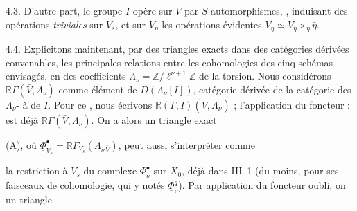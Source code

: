 \documentclass[11pt,a4paper]{article}
\begin{document}
4.3. D'autre part, le groupe $I$ opère sur $\bar V$ par $S$-automorphismes,
, 
induisant des opérations \emph{triviales} sur $V_{\bar s}$, et sur $V_{\bar\eta}$ les
 opérations évidentes 
$V_{\bar\eta} \simeq V_\eta \times_\eta \bar\eta$.

4.4. Explicitons maintenant, par des triangles exacts dans des catégories dérivées
convenables, les principales relations \struck{\ill{}} entre les cohomologies des cinq
schémas envisagés, en  des coefficients
$\Lambda_\nu = \mathbb{Z}/\ell^{\nu+1}\mathbb{Z}$  \ill{} de la torsion.
Nous considérons
$\mathbb{R}\Gamma(\bar V, \Lambda_\nu)$ comme élément de
$D(\Lambda_\nu[I])$, catégorie dérivée de la catégorie des $\Lambda_\nu$-
à   de $I$. Pour  ce ,
nous écrivons  $\mathbb{R}(\Gamma, I)(\bar V, \Lambda_\nu)$ ;
l'application du foncteur  : est déjà 
$\mathbb{R}\Gamma(\bar V, \Lambda_\nu)$. On a alors un triangle exact


(A), où $\underline{\Phi}^\bullet_{V_s} = \mathbb{R}\Gamma_{V_{\bar s}}(\Lambda_{\nu\,\bar V})$,
peut aussi s'interpréter comme


la restriction à $V_s$ du complexe $\underline{\Phi}^\bullet_\nu$ 
sur $X_0$, déjà   dans III~1 (du moins,
pour ses faisceaux de cohomologie, qui y \struck{\ill{}}  notés
$\underline{\Phi}^q_\nu$). Par application du foncteur oubli, on  un triangle

\end{document}
